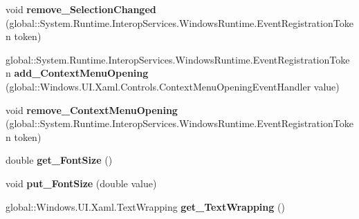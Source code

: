 \begin{DoxyCompactItemize}
\item 
\mbox{\label{interface_windows_1_1_u_i_1_1_xaml_1_1_controls_1_1_i_text_block_aa5f21aa6c1bfe8efdedfd5dbd95e003a}} 
void {\bfseries remove\+\_\+\+Selection\+Changed} (global\+::\+System.\+Runtime.\+Interop\+Services.\+Windows\+Runtime.\+Event\+Registration\+Token token)
\item 
\mbox{\label{interface_windows_1_1_u_i_1_1_xaml_1_1_controls_1_1_i_text_block_a1d8100da7fff6292db5c7e88860bb898}} 
global\+::\+System.\+Runtime.\+Interop\+Services.\+Windows\+Runtime.\+Event\+Registration\+Token {\bfseries add\+\_\+\+Context\+Menu\+Opening} (global\+::\+Windows.\+U\+I.\+Xaml.\+Controls.\+Context\+Menu\+Opening\+Event\+Handler value)
\item 
\mbox{\label{interface_windows_1_1_u_i_1_1_xaml_1_1_controls_1_1_i_text_block_a68593635321b0b8cd439a3d341f86485}} 
void {\bfseries remove\+\_\+\+Context\+Menu\+Opening} (global\+::\+System.\+Runtime.\+Interop\+Services.\+Windows\+Runtime.\+Event\+Registration\+Token token)
\item 
\mbox{\label{interface_windows_1_1_u_i_1_1_xaml_1_1_controls_1_1_i_text_block_a9912fea3536da888623b2947225a9d6d}} 
double {\bfseries get\+\_\+\+Font\+Size} ()
\item 
\mbox{\label{interface_windows_1_1_u_i_1_1_xaml_1_1_controls_1_1_i_text_block_a6bee3c5a6d60cdfb17958f446638701f}} 
void {\bfseries put\+\_\+\+Font\+Size} (double value)
\item 
\mbox{\label{interface_windows_1_1_u_i_1_1_xaml_1_1_controls_1_1_i_text_block_a912cc8618a3b0c565221ad7580825895}} 
global\+::\+Windows.\+U\+I.\+Xaml.\+Text\+Wrapping {\bfseries get\+\_\+\+Text\+Wrapping} ()
\item 
\mbox{\label{interface_windows_1_1_u_i_1_1_xaml_1_1_controls_1_1_i_text_block_a8b3ae1457755d87019558339b825f1df}} 

\end{DoxyCompactItemize}
